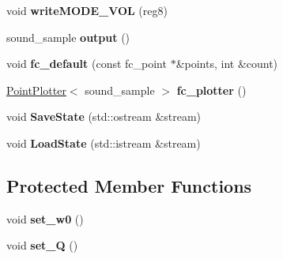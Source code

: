 \begin{DoxyCompactItemize}
\item 
\hypertarget{classFilter_a240e596f9987391e6d8e8220956fec09}{void {\bfseries write\-M\-O\-D\-E\-\_\-\-V\-O\-L} (reg8)}\label{classFilter_a240e596f9987391e6d8e8220956fec09}

\item 
\hypertarget{classFilter_aae9a9e87d5ad4124532706e9c9faace7}{sound\-\_\-sample {\bfseries output} ()}\label{classFilter_aae9a9e87d5ad4124532706e9c9faace7}

\item 
\hypertarget{classFilter_a5d60310354f0e32114fdb117e31dc511}{void {\bfseries fc\-\_\-default} (const fc\-\_\-point $\ast$\&points, int \&count)}\label{classFilter_a5d60310354f0e32114fdb117e31dc511}

\item 
\hypertarget{classFilter_a6ed669f719600578e747fe8629193132}{\hyperlink{classPointPlotter}{Point\-Plotter}$<$ sound\-\_\-sample $>$ {\bfseries fc\-\_\-plotter} ()}\label{classFilter_a6ed669f719600578e747fe8629193132}

\item 
\hypertarget{classFilter_ad3ece5f1bf0acd6fcb8369cb7294b2b9}{void {\bfseries Save\-State} (std\-::ostream \&stream)}\label{classFilter_ad3ece5f1bf0acd6fcb8369cb7294b2b9}

\item 
\hypertarget{classFilter_ad718ebe3373ed265baba5556c2fcdeb4}{void {\bfseries Load\-State} (std\-::istream \&stream)}\label{classFilter_ad718ebe3373ed265baba5556c2fcdeb4}

\end{DoxyCompactItemize}
\subsection*{Protected Member Functions}
\begin{DoxyCompactItemize}
\item 
\hypertarget{classFilter_acc3b74c7fb4999da2c7ae46e996cc8ca}{void {\bfseries set\-\_\-w0} ()}\label{classFilter_acc3b74c7fb4999da2c7ae46e996cc8ca}

\item 
\hypertarget{classFilter_a1b9e6714d4adc4c24ab45e23fd4b84db}{void {\bfseries set\-\_\-\-Q} ()}\label{classFilter_a1b9e6714d4adc4c24ab45e23fd4b84db}

\end{DoxyCompactItemize}

